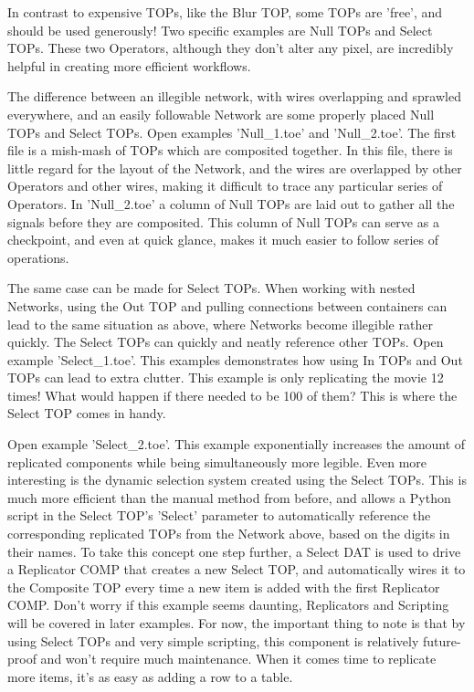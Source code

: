 \begin{fullwidth}
In contrast to expensive TOPs, like the Blur TOP, some TOPs are 'free', and should be used generously! Two specific examples are Null TOPs and Select TOPs. These two Operators, although they don't alter any pixel, are incredibly helpful in creating more efficient workflows.

The difference between an illegible network, with wires overlapping and sprawled everywhere, and an easily followable Network are some properly placed Null TOPs and Select TOPs. Open examples 'Null\_1.toe' and 'Null\_2.toe'. The first file is a mish-mash of TOPs which are composited together. In this file, there is little regard for the layout of the Network, and the wires are overlapped by other Operators and other wires, making it difficult to trace any particular series of Operators. In 'Null\_2.toe' a column of Null TOPs are laid out to gather all the signals before they are composited. This column of Null TOPs can serve as a checkpoint, and even at quick glance, makes it much easier to follow series of operations.

The same case can be made for Select TOPs. When working with nested Networks, using the Out TOP and pulling connections between containers can lead to the same situation as above, where Networks become illegible rather quickly. The Select TOPs can quickly and neatly reference other TOPs. Open example 'Select\_1.toe'. This examples demonstrates how using In TOPs and Out TOPs can lead to extra clutter. This example is only replicating the movie 12 times! What would happen if there needed to be 100 of them? This is where the Select TOP comes in handy.

Open example 'Select\_2.toe'. This example exponentially increases the amount of replicated components while being simultaneously more legible. Even more interesting is the dynamic selection system created using the Select TOPs. This is much more efficient than the manual method from before, and allows a Python script in the Select TOP's 'Select' parameter to automatically reference the corresponding replicated TOPs from the Network above, based on the digits in their names. To take this concept one step further, a Select DAT is used to drive a Replicator COMP that creates a new Select TOP, and automatically wires it to the Composite TOP every time a new item is added with the first Replicator COMP. Don't worry if this example seems daunting, Replicators and Scripting will be covered in later examples. For now, the important thing to note is that by using Select TOPs and very simple scripting, this component is relatively future-proof and won't require much maintenance. When it comes time to  replicate more items, it's as easy as adding a row to a table.
\end{fullwidth}

